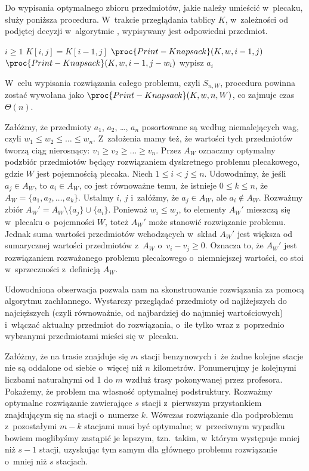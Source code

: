 Do wypisania optymalnego zbioru przedmiotów, jakie należy umieścić w~plecaku, służy poniższa procedura.
W~trakcie przeglądania tablicy $K$, w~zależności od podjętej decyzji w~algorytmie , wypisywany jest odpowiedni przedmiot.
\begin{codebox}
\li	\If $i\ge1$
\li		\Then \If $K[i,j]=K[i-1,j]$
\li				\Then $\proc{Print-Knapsack}(K,w,i-1,j)$
\li				\Else $\proc{Print-Knapsack}(K,w,i-1,j-w_i)$
\li					wypisz $a_i$
				\End
		\End
\end{codebox}
W~celu wypisania rozwiązania całego problemu, czyli $S_{n,W}$, procedura powinna zostać wywołana jako $\proc{Print-Knapsack}(K,w,n,W)$, co zajmuje czas $\Theta(n)$.

\exercise %
Załóżmy, że przedmioty $a_1$, $a_2$, \dots, $a_n$ posortowane są według niemalejących wag, czyli $w_1\le w_2\le\dots\le w_n$.
Z~założenia mamy też, że wartości tych przedmiotów tworzą ciąg nierosnący: $v_1\ge v_2\ge\dots\ge v_n$.
Przez $A_W$ oznaczmy optymalny podzbiór przedmiotów będący rozwiązaniem dyskretnego problemu plecakowego, gdzie $W$ jest pojemnością plecaka.
Niech $1\le i<j\le n$.
Udowodnimy, że jeśli $a_j\in A_W$, to $a_i\in A_W$, co jest równoważne temu, że istnieje $0\le k\le n$, że $A_W=\{a_1,a_2,\dots,a_k\}$.
Ustalmy $i$, $j$ i~załóżmy, że $a_j\in A_W$, ale $a_i\not\in A_W$.
Rozważmy zbiór $A_W'=A_W\setminus\{a_j\}\cup\{a_i\}$.
Ponieważ $w_i\le w_j$, to elementy $A_W'$ mieszczą się w~plecaku o~pojemności $W$, toteż $A_W'$ może stanowić rozwiązanie problemu.
Jednak suma wartości przedmiotów wchodzących w~skład $A_W'$ jest większa od sumarycznej wartości przedmiotów z~$A_W$ o~$v_i-v_j\ge0$.
Oznacza to, że $A_W'$ jest rozwiązaniem rozważanego problemu plecakowego o~niemniejszej wartości, co stoi w~sprzeczności z~definicją $A_W$.

Udowodniona obserwacja pozwala nam na skonstruowanie rozwiązania za pomocą algorytmu zachłannego.
Wystarczy przeglądać przedmioty od najlżejszych do najcięższych (czyli równoważnie, od najbardziej do najmniej wartościowych) i~włączać aktualny przedmiot do rozwiązania, o~ile tylko wraz z~poprzednio wybranymi przedmiotami mieści się w~plecaku.

\exercise %
Załóżmy, że na trasie znajduje się $m$ stacji benzynowych i~że żadne kolejne stacje nie są oddalone od siebie o~więcej niż $n$ kilometrów.
Ponumerujmy je kolejnymi liczbami naturalnymi od 1 do $m$ wzdłuż trasy pokonywanej przez profesora.
Pokażemy, że problem ma własność optymalnej podstruktury.
Rozważmy optymalne rozwiązanie zawierające $s$ stacji z~pierwszym przystankiem znajdującym się na stacji o~numerze $k$.
Wówczas rozwiązanie dla podproblemu z~pozostałymi $m-k$ stacjami musi być optymalne; w~przeciwnym wypadku bowiem moglibyśmy zastąpić je lepszym, tzn.\ takim, w~którym występuje mniej niż $s-1$ stacji, uzyskując tym samym dla głównego problemu rozwiązanie o~mniej niż $s$ stacjach.

